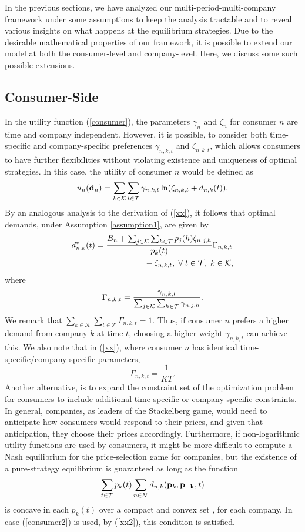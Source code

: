  
 In the previous sections, we have analyzed our multi-period-multi-company framework under some assumptions to keep the analysis tractable and to reveal various insights on what happens at the equilibrium strategies. Due to the desirable mathematical properties of our framework, it is possible to extend our model at both the consumer-level and company-level. Here, we discuss some such possible extensions. 
 
\subsection{Consumer-Side}
In the utility function (\ref{consumer}), the parameters $\gamma_n$ and $\zeta_n$ for consumer $n$ are time and company independent. However, it is possible, to consider both time-specific and company-specific preferences $\gamma_{n,k,t}$ and $\zeta_{n,k,t}$, which allows consumers to have further flexibilities without violating existence and uniqueness of optimal strategies. In this case, the utility of consumer $n$ would be defined as 
\begin{equation}{u_n(\mathbf{d}_{n})=\sum_{k\in {\cal K}}\sum_{t\in {\cal T}}\gamma_{n,k,t}\ln(\zeta_{n,k,t}+d_{n,k}(t))}. \label{consumer2}\end{equation}
By an analogous analysis to the derivation of (\ref{xx}), it follows that optimal demands, under Assumption \ref{assumption1}, are given by
 \begin{align}
d^*_{n,k}(t)&= \frac{B_n+\sum_{j\in {\cal K}}\sum_{h\in {\cal T}}p_j(h)\zeta_{n,j,h}}{p_k(t)} \Gamma_{n,k,t} \nonumber\\
 &\qquad \qquad\qquad-\zeta_{n,k,t},  \; \forall \;t\in {\cal T}, \; k\in {\cal K},  \label{xx2}
\end{align}
where $$\Gamma_{n,k,t}=\frac{\gamma_{n,k,t}}{\sum_{j\in {\cal K}}\sum_{h\in {\cal T}}\gamma_{n,j,h}}.$$ 
We remark that $\sum_{k\in\mathcal{K}}\sum_{t\in\mathcal{T}}\Gamma_{n,k,t}=1$. Thus, if consumer $n$ prefers a higher demand from company $k$ at time $t$, choosing a higher weight $\gamma_{n,k,t}$ can achieve this. We also note that in (\ref{xx}), where consumer $n$ has identical time-specific/company-specific parameters,  $$\Gamma_{n,k,t}=\frac{1}{KT}.$$ Another alternative, is to expand the constraint set of the optimization problem for consumers to include additional time-specific or company-specific constraints. In general, companies, as leaders of the Stackelberg game, would need to anticipate how consumers would respond to their prices, and given that anticipation, they choose their prices accordingly. Furthermore,  if non-logarithmic utility functions are used by consumers, it might be more difficult to compute a Nash equilibrium for the price-selection game for companies, but the existence of a pure-strategy equilibrium is guaranteed as long as the function 
$$\sum_{t\in {\cal T}}p_k(t)\sum_{n\in {\cal N}}d_{n,k}({\bf{p}}_k,{\bf{p_{-k}}},t)$$
is concave in each $p_k(t)$ over a compact and convex set \cite{basar}, for each company. In case (\ref{consumer2}) is used, by (\ref{xx2}), this condition is satisfied.  

